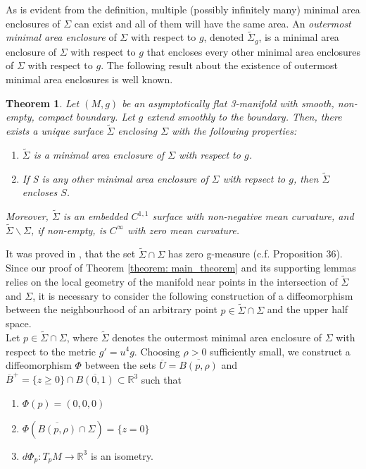 \documentclass{amsart}
\newcommand{\ts}{\tilde{\Sigma}}
\newcommand{\s}{\Sigma}
\newtheorem{theorem}{Theorem}
\theoremstyle{named}
\begin{document}
As is evident from the definition, multiple (possibly infinitely many) minimal area enclosures of $\Sigma$ can exist and all of them will have the same area. An \textit{outermost minimal area enclosure} of $\Sigma$ with respect to $g$, denoted $\ts_g$, is a minimal area enclosure of $\s$ with respect to $g$ that encloses every other minimal area enclosures of $\Sigma$ with respect to $g$. The following result about the existence of outermost minimal area enclosures is well known\cite{bray1999proof, huiskenilmanen}.

\begin{theorem}
    Let $(M,g)$ be an asymptotically flat 3-manifold with smooth, non-empty, compact boundary. Let $g$ extend smoothly to the boundary. Then, there exists a unique surface $\ts$ enclosing $\Sigma$ with the following properties:

    \begin{enumerate}
        \item $\ts$ is a minimal area enclosure of $\Sigma$ with respect to $g$.
        \item If S is any other minimal area enclosure of $\Sigma$ with repsect to $g$, then $\ts$ encloses $S$.
    \end{enumerate}
    Moreover, $\ts$ is an embedded $C^{1,1}$ surface with non-negative mean curvature, and $\ts \backslash \Sigma$, if non-empty, is $C^{\infty}$ with zero mean curvature.
\end{theorem}

It was proved in \cite{jeff}, that the set $\ts \cap \s$ has zero g-measure (c.f. Proposition 36). Since our proof of Theorem \ref{theorem: main_theorem} and its supporting lemmas relies on the local geometry of the manifold near points in the intersection of $\ts$ and $\s$, it is necessary to consider the following construction of a diffeomorphism between the neighbourhood of an arbitrary point $p \in \ts \cap \s$ and the upper half space. \cite{jeff} \\

Let $p \in \ts \cap \Sigma$, where $\ts$ denotes the outermost minimal area enclosure of $\Sigma$ with respect to the metric $g' = u^{4}g$. Choosing $\rho > 0$ sufficiently small, we construct a diffeomorphism $\Phi$ between the sets $\overline{U} = \overline{B(p,\rho)}$ and $\overline{B}^{+} = \{z \geq 0 \} \cap \overline{B(0,1)} \subset \mathbb{R}^3$ such that \\

\begin{enumerate}
    \item $\Phi(p) = (0,0,0)$
    \item $\Phi(\overline{B(p, \rho)} \cap \Sigma) = \{ z=0 \}$
    \item $d\Phi_{p} : T_{p}M \xrightarrow{} \mathbb{R}^{3}$ is an isometry.
\end{enumerate} 
\end{document}

